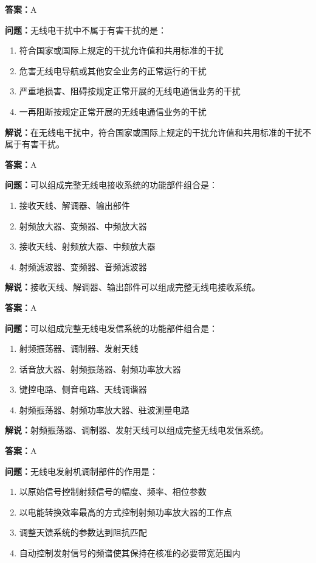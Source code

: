 \textbf{答案：}A

\textbf{问题：}无线电干扰中不属于有害干扰的是：

\begin{enumerate}[label=\Alph*), leftmargin=1cm]
	\item 符合国家或国际上规定的干扰允许值和共用标准的干扰
	\item 危害无线电导航或其他安全业务的正常运行的干扰
	\item 严重地损害、阻碍按规定正常开展的无线电通信业务的干扰
	\item 一再阻断按规定正常开展的无线电通信业务的干扰
\end{enumerate}

\textbf{解说：}在无线电干扰中，符合国家或国际上规定的干扰允许值和共用标准的干扰不属于有害干扰。%

\textbf{答案：}A

\textbf{问题：}可以组成完整无线电接收系统的功能部件组合是：

\begin{enumerate}[label=\Alph*), leftmargin=1cm]
	\item 接收天线、解调器、输出部件
	\item 射频放大器、变频器、中频放大器
	\item 接收天线、射频放大器、中频放大器
	\item 射频滤波器、变频器、音频滤波器
\end{enumerate}

\textbf{解说：}接收天线、解调器、输出部件可以组成完整无线电接收系统。%

\textbf{答案：}A

\textbf{问题：}可以组成完整无线电发信系统的功能部件组合是：

\begin{enumerate}[label=\Alph*), leftmargin=1cm]
	\item 射频振荡器、调制器、发射天线
	\item 话音放大器、射频振荡器、射频功率放大器
	\item 键控电路、侧音电路、天线调谐器
	\item 射频振荡器、射频功率放大器、驻波测量电路
\end{enumerate}

\textbf{解说：}射频振荡器、调制器、发射天线可以组成完整无线电发信系统。%

\textbf{答案：}A

\textbf{问题：}无线电发射机调制部件的作用是：

\begin{enumerate}[label=\Alph*), leftmargin=1cm]
	\item 以原始信号控制射频信号的幅度、频率、相位参数
	\item 以电能转换效率最高的方式控制射频功率放大器的工作点
	\item 调整天馈系统的参数达到阻抗匹配
	\item 自动控制发射信号的频谱使其保持在核准的必要带宽范围内
\end{enumerate}

